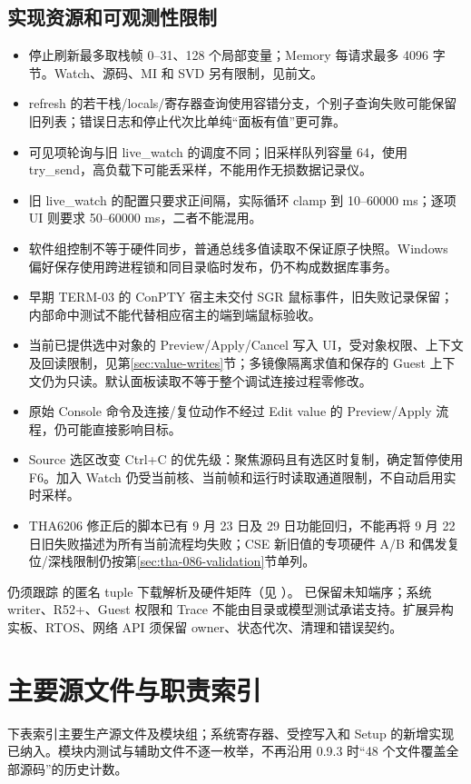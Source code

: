 \documentclass[UTF8,a4paper,11pt,oneside,fontset=none]{ctexart}
\newcommand{\newsection}[1]{\par\Needspace{10\baselineskip}\section{#1}}
\begin{document}
\subsection{实现资源和可观测性限制}
\begin{itemize}
\item 停止刷新最多取栈帧 0--31、128 个局部变量；Memory 每请求最多 4096 字节。Watch、源码、MI 和 SVD 另有限制，见前文。
\item refresh 的若干栈/locals/寄存器查询使用容错分支，个别子查询失败可能保留旧列表；错误日志和停止代次比单纯“面板有值”更可靠。
\item 可见项轮询与旧 live\_watch 的调度不同；旧采样队列容量 64，使用 try\_send，高负载下可能丢采样，不能用作无损数据记录仪。
\item 旧 live\_watch 的配置只要求正间隔，实际循环 clamp 到 10--60000 ms；逐项 UI 则要求 50--60000 ms，二者不能混用。
\item 软件组控制不等于硬件同步，普通总线多值读取不保证原子快照。Windows 偏好保存使用跨进程锁和同目录临时发布，仍不构成数据库事务。
\item 早期 TERM-03 的 ConPTY 宿主未交付 SGR 鼠标事件，旧失败记录保留；内部命中测试不能代替相应宿主的端到端鼠标验收。
\item 当前已提供选中对象的 Preview/Apply/Cancel 写入 UI，受对象权限、上下文及回读限制，见第\ref{sec:value-writes}节；多镜像隔离求值和保存的 Guest 上下文仍为只读。默认面板读取不等于整个调试连接过程零修改。
\item 原始 Console 命令及连接/复位动作不经过 Edit value 的 Preview/Apply 流程，仍可能直接影响目标。
\item Source 选区改变 Ctrl+C 的优先级：聚焦源码且有选区时复制，确定暂停使用 F6。加入 Watch 仍受当前核、当前帧和运行时读取通道限制，不自动启用实时采样。
\item THA6206 修正后的脚本已有 9 月 23 日及 29 日功能回归，不能再将 9 月 22 日旧失败描述为所有当前流程均失败；CSE 新旧值的专项硬件 A/B 和偶发复位/深栈限制仍按第\ref{sec:tha-086-validation}节单列。
\end{itemize}

仍须跟踪  的匿名 tuple 下载解析及硬件矩阵（见 ）。 已保留未知端序；系统 writer、R52+、Guest 权限和 Trace 不能由目录或模型测试承诺支持。扩展异构实板、RTOS、网络 API 须保留 owner、状态代次、清理和错误契约。

\clearpage\appendix
\newsection{主要源文件与职责索引}
下表索引主要生产源文件及模块组；系统寄存器、受控写入和 Setup 的新增实现已纳入。模块内测试与辅助文件不逐一枚举，不再沿用 0.9.3 时“48 个文件覆盖全部源码”的历史计数。
\end{document}
